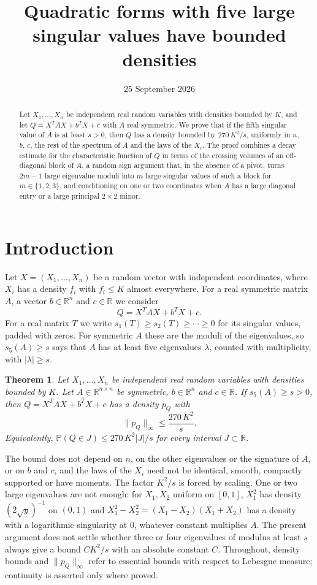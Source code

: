 \documentclass[11pt]{amsart}
\title{Quadratic forms with five large singular values have bounded densities}
\date{25 September 2026}
\numberwithin{equation}{section}
\newtheorem{theorem}{Theorem}[section]
\theoremstyle{definition}
\theoremstyle{remark}
\newcommand{\R}{\mathbb R}
\newcommand{\PP}{\mathbb P}
\newcommand{\1}{\mathbf 1}
\newcommand{\norm}[1]{\lVert #1\rVert}
\newcommand{\abs}[1]{\lvert #1\rvert}
\begin{document}
\begin{abstract}
Let $X_1,\dots,X_n$ be independent real random variables with densities bounded by $K$, and let $Q=X^{T}AX+b^{T}X+c$ with $A$ real symmetric. We prove that if the fifth singular value of $A$ is at least $s>0$, then $Q$ has a density bounded by $270\,K^2/s$, uniformly in $n$, $b$, $c$, the rest of the spectrum of $A$ and the laws of the $X_i$. The proof combines a decay estimate for the characteristic function of $Q$ in terms of the crossing volumes of an off-diagonal block of $A$, a random sign argument that, in the absence of a pivot, turns $2m-1$ large eigenvalue moduli into $m$ large singular values of such a block for $m\in\{1,2,3\}$, and conditioning on one or two coordinates when $A$ has a large diagonal entry or a large principal $2\times2$ minor.
\end{abstract}

\maketitle

\section{Introduction}\label{sec:intro}

Let $X=(X_1,\dots,X_n)$ be a random vector with independent coordinates, where $X_i$ has a density $f_i$ with $f_i\le K$ almost everywhere. For a real symmetric matrix $A$, a vector $b\in\R^n$ and $c\in\R$ we consider
\[
Q=X^{T}AX+b^{T}X+c .
\]
For a real matrix $T$ we write $s_1(T)\ge s_2(T)\ge\cdots\ge0$ for its singular values, padded with zeros. For symmetric $A$ these are the moduli of the eigenvalues, so $s_5(A)\ge s$ says that $A$ has at least five eigenvalues $\lambda$, counted with multiplicity, with $\abs\lambda\ge s$.

\begin{theorem}\label{thm:main}
Let $X_1,\dots,X_n$ be independent real random variables with densities bounded by $K$. Let $A\in\R^{n\times n}$ be symmetric, $b\in\R^n$ and $c\in\R$. If $s_5(A)\ge s>0$, then $Q=X^TAX+b^TX+c$ has a density $p_Q$ with
\[
\norm{p_Q}_\infty\le \frac{270\,K^2}{s}.
\]
Equivalently, $\PP(Q\in J)\le 270\,K^2\abs J/s$ for every interval $J\subset\R$.
\end{theorem}

The bound does not depend on $n$, on the other eigenvalues or the signature of $A$, or on $b$ and $c$, and the laws of the $X_i$ need not be identical, smooth, compactly supported or have moments. The factor $K^2/s$ is forced by scaling. One or two large eigenvalues are not enough: for $X_1,X_2$ uniform on $[0,1]$, $X_1^2$ has density $(2\sqrt y)^{-1}$ on $(0,1)$ and $X_1^2-X_2^2=(X_1-X_2)(X_1+X_2)$ has a density with a logarithmic singularity at $0$, whatever constant multiplies $A$. The present argument does not settle whether three or four eigenvalues of modulus at least $s$ always give a bound $CK^2/s$ with an absolute constant $C$. Throughout, density bounds and $\norm{p_Q}_\infty$ refer to essential bounds with respect to Lebesgue measure; continuity is asserted only where proved.
\end{document}

